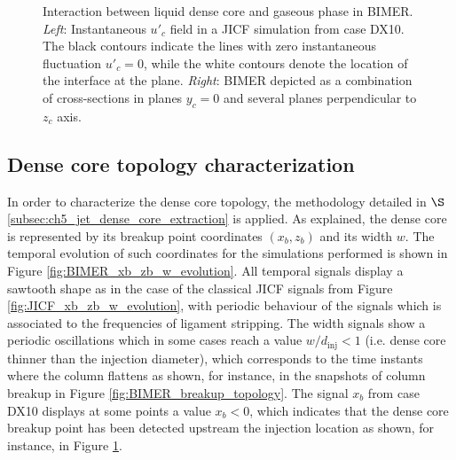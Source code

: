 \begin{figure}[ht]
\centering
{}
\caption[Interaction between liquid dense core and gaseous phase in BIMER]{Interaction between liquid dense core and gaseous phase in BIMER. \textsl{Left}: Instantaneous $u'_c$ field in a JICF simulation from case DX10. The black contours indicate the lines with zero instantaneous fluctuation $u'_c = 0$, while the white contours denote the location of the interface at the plane. \textsl{Right}: BIMER depicted as a combination of cross-sections in planes $y _c= 0$ and several planes perpendicular to $z_c$ axis.}
\label{fig:BIMER_jet_air_interaction_up_and_skeleton}
\end{figure}

\subsection{Dense core topology characterization}
\label{subsec:ch8_BIMER_DC_topology}

In order to characterize the dense core topology, the methodology detailed in $\S$\ref{subsec:ch5_jet_dense_core_extraction} is applied. As explained, the dense core is represented by its breakup point coordinates $\left( x_b, z_b \right)$ and its width $w$. The temporal evolution of such coordinates for the simulations performed is shown in Figure \ref{fig:BIMER_xb_zb_w_evolution}. All temporal signals display a sawtooth shape as in the case of the classical JICF signals from Figure 
\ref{fig:JICF_xb_zb_w_evolution}, with periodic behaviour of the signals which is associated to the frequencies of ligament stripping. The width signals show a periodic oscillations which in some cases reach a value $w/d_\mathrm{inj} < 1$ (i.e. dense core thinner than the injection diameter), which corresponds to the time instants where the column flattens as shown, for instance, in the snapshots of column breakup in Figure \ref{fig:BIMER_breakup_topology}. The signal $x_b$ from case DX10 displays at some points a value $x_b < 0$, which indicates that the dense core breakup point has been detected upstream the injection location as shown, for instance, in Figure \ref{fig:BIMER_jet_air_interaction_up_and_skeleton}.

